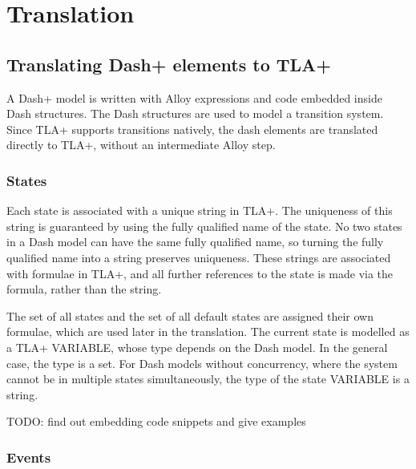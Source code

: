 \chapter{Translation}



\section{Translating Dash+ elements to TLA+}

A Dash+ model is written with Alloy expressions and code embedded inside Dash structures. The Dash structures are used to model a transition system. Since TLA+ supports transitions natively, the dash elements are translated directly to TLA+, without an intermediate Alloy step.


\subsection{States}

Each state is associated with a unique string in TLA+. The uniqueness of this string is guaranteed by using the fully qualified name of the state. No two states in a Dash model can have the same fully qualified name, so turning the fully qualified name into a string preserves uniqueness. These strings are associated with formulae in TLA+, and all further references to the state is made via the formula, rather than the string.

The set of all states and the set of all default states are assigned their own formulae, which are used later in the translation. The current state is modelled as a TLA+ VARIABLE, whose type depends on the Dash model. In the general case, the type is a set. For Dash models without concurrency, where the system cannot be in multiple states simultaneously, the type of the state VARIABLE is a string.

TODO: find out embedding code snippets and give examples

\subsection{Events}

